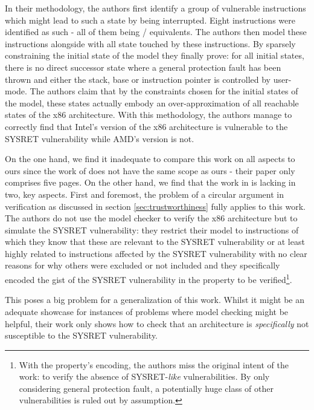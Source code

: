 In their methodology, the authors first identify a group of vulnerable instructions which might lead to such a state by being interrupted.
Eight instructions were identified as such - all of them being / equivalents.
The authors then model these instructions alongside with all state touched by these instructions.
By sparsely constraining the initial state of the model they finally prove: for all initial states, there is no direct successor state where a general protection fault has been thrown and either the stack, base or instruction pointer is controlled by user-mode.
The authors claim that by the constraints chosen for the initial states of the model, these states actually embody an over-approximation of all reachable states of the x86 architecture.
With this methodology, the authors manage to correctly find that Intel's version of the x86 architecture is vulnerable to the SYSRET vulnerability while AMD's version is not.

On the one hand, we find it inadequate to compare this work on all aspects to ours since the work of \citeauthor{BradfieldS16} does not have the same scope as ours - their paper only comprises five pages.
On the other hand, we find that the work in \cite{BradfieldS16} is lacking in two, key aspects.
First and foremost, the problem of a circular argument in verification as discussed in section \ref{sec:trustworthiness} fully applies to this work.
The authors do not use the model checker to verify the x86 architecture but to simulate the SYSRET vulnerability: they restrict their model to instructions of which they know that these are relevant to the SYSRET vulnerability or at least highly related to instructions affected by the SYSRET vulnerability with no clear reasons for why others were excluded or not included and they specifically encoded the gist of the SYSRET vulnerability in the property to be verified\footnote{%
    With the property's encoding, the authors miss the original intent of the work: to verify the absence of SYSRET-\textit{like} vulnerabilities.
    By only considering general protection fault, a potentially huge class of other vulnerabilities is ruled out by assumption.
}.

This poses a big problem for a generalization of this work.
Whilst it might be an adequate showcase for instances of problems where model checking might be helpful, their work only shows how to check that an architecture is \textit{specifically} not susceptible to the SYSRET vulnerability.

